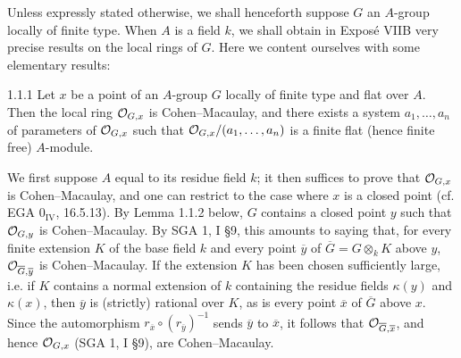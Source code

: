 Unless expressly stated otherwise, we shall henceforth suppose $G$ an $A$-group locally of finite type. When $A$ is a field $k$, we shall obtain in Exposé VIIB very precise results on the local rings of $G$. Here we content ourselves with some elementary results:
\begin{proposition}{1.1.1}\label{VIA.1.1.1}
Let $x$ be a point of an $A$-group $G$ locally of finite type and flat over $A$. Then the local ring $\mathcal{O}_{G,x}$ is Cohen--Macaulay, and there exists a system $a_1,\ldots,a_n$ of parameters of $\mathcal{O}_{G,x}$ such that $\mathcal{O}_{G,x}/(a_1,\ldots,a_n)$ is a finite flat (hence finite free) $A$-module.
\end{proposition}
We first suppose $A$ equal to its residue field $k$; it then suffices to prove that $\mathcal{O}_{G,x}$ is Cohen--Macaulay, and one can restrict to the case where $x$ is a closed point (cf. EGA $0_{\mathrm{IV}}$, 16.5.13). By Lemma 1.1.2 below, $G$ contains a closed point $y$ such that $\mathcal{O}_{G,y}$ is Cohen--Macaulay. By SGA 1, I §9, this amounts to saying that, for every finite extension $K$ of the base field $k$ and every point $\overline y$ of $\overline G=G\otimes_kK$ above $y$, $\mathcal{O}_{\overline G,\overline y}$ is Cohen--Macaulay. If the extension $K$ has been chosen sufficiently large, i.e. if $K$ contains a normal extension of $k$ containing the residue fields $\kappa(y)$ and $\kappa(x)$, then $\overline y$ is (strictly) rational over $K$, as is every point $\overline x$ of $\overline G$ above $x$. Since the automorphism $r_{\overline x}\circ(r_{\overline y})^{-1}$ sends $\overline y$ to $\overline x$, it follows that $\mathcal{O}_{\overline G,\overline x}$, and hence $\mathcal{O}_{G,x}$ (SGA 1, I §9), are Cohen--Macaulay.


